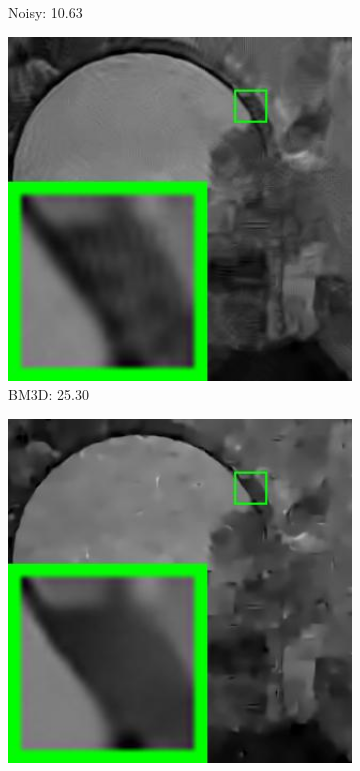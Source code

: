 \begin{figure}
\begin{subfigure}[t]{0.24\textwidth}
		\caption{Noisy: 10.63}
    \end{subfigure}
    \hfill
    \begin{subfigure}[t]{0.24\textwidth}
        \centering
        \includegraphics[width=1\textwidth]{images/pgpd/200img/br_BM3D_75_5096.jpg}
		\caption{BM3D: 25.30}
    \end{subfigure}
    \hfill
    \begin{subfigure}[t]{0.24\textwidth}
        \centering
        \includegraphics[width=1\textwidth]{images/pgpd/200img/br_EPLL_75_5096.jpg}

\end{subfigure}
\end{figure}
